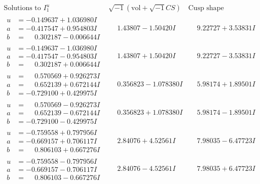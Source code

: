 \documentclass[1p]{elsarticle_modified}
\theoremstyle{definition}
\newcommand{\I}{\sqrt{-1}}
\begin{document}
$$\begin{array}{c|c|c}  
\text{Solutions to }I^u_{1}& \I (\text{vol} + \sqrt{-1}CS) & \text{Cusp shape}\\
 \hline 
\begin{aligned}
u &= -0.149637 + 1.036980 I \\
a &= -0.417547 + 0.954803 I \\
b &= \phantom{-}0.302187 - 0.006644 I\end{aligned}
 & \phantom{-}1.43807 - 1.50420 I & \phantom{-}9.22727 + 3.53831 I \\ \hline\begin{aligned}
u &= -0.149637 - 1.036980 I \\
a &= -0.417547 - 0.954803 I \\
b &= \phantom{-}0.302187 + 0.006644 I\end{aligned}
 & \phantom{-}1.43807 + 1.50420 I & \phantom{-}9.22727 - 3.53831 I \\ \hline\begin{aligned}
u &= \phantom{-}0.570569 + 0.926273 I \\
a &= \phantom{-}0.652139 + 0.672144 I \\
b &= -0.729100 + 0.429975 I\end{aligned}
 & \phantom{-}0.356823 - 1.078380 I & \phantom{-}5.98174 + 1.89501 I \\ \hline\begin{aligned}
u &= \phantom{-}0.570569 - 0.926273 I \\
a &= \phantom{-}0.652139 - 0.672144 I \\
b &= -0.729100 - 0.429975 I\end{aligned}
 & \phantom{-}0.356823 + 1.078380 I & \phantom{-}5.98174 - 1.89501 I \\ \hline\begin{aligned}
u &= -0.759558 + 0.797956 I \\
a &= -0.669157 + 0.706117 I \\
b &= \phantom{-}0.806103 + 0.667276 I\end{aligned}
 & \phantom{-}2.84076 + 4.52561 I & \phantom{-}7.98035 - 6.47723 I \\ \hline\begin{aligned}
u &= -0.759558 - 0.797956 I \\
a &= -0.669157 - 0.706117 I \\
b &= \phantom{-}0.806103 - 0.667276 I\end{aligned}
 & \phantom{-}2.84076 - 4.52561 I & \phantom{-}7.98035 + 6.47723 I \\ \hline\begin{aligned}

\end{aligned}
\end{array}$$
\end{document}
